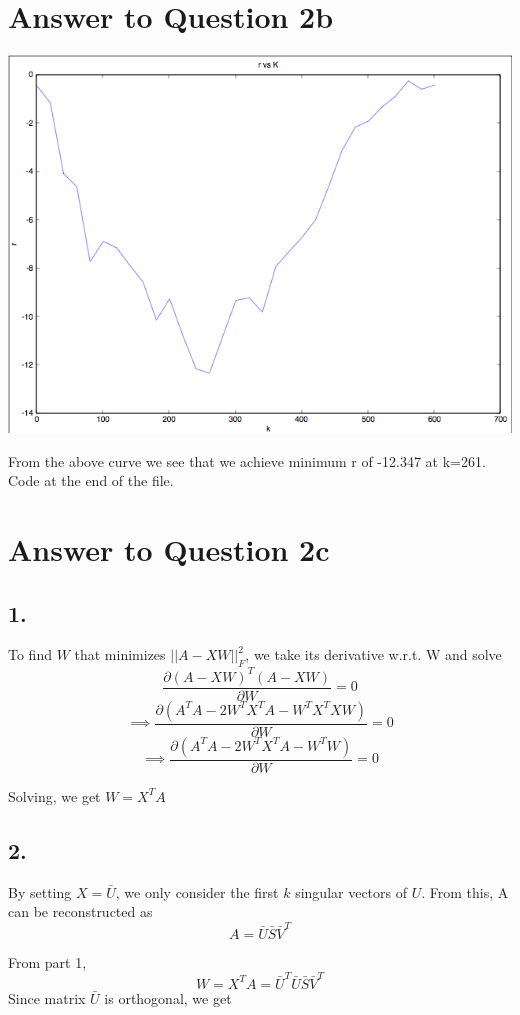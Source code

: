 \documentclass[11pt]{article}
\begin{document}
{\section*{Answer to Question 2b}
\includegraphics[scale=0.8]{q2err}

From the above curve we see that we achieve minimum r of -12.347 at k=261.\\

Code at the end of the file.
\pagebreak[4]
\section*{Answer to Question 2c}

\subsection*{1.}
To find $W$ that minimizes $||A-XW||_F^2$, we take its derivative w.r.t. W and solve
$$ \frac{\partial (A-XW)^T(A-XW)}{\partial W} = 0 $$
$$ \implies \frac{\partial (A^TA-2W^TX^TA-W^TX^TXW)}{\partial W} = 0 $$
$$ \implies \frac{\partial (A^TA-2W^TX^TA-W^TW)}{\partial W} = 0 $$

Solving, we get $W = X^T A$

\subsection*{2.}
By setting $X = \bar{U}$, we only consider the first $k$ singular vectors of $U$. From this, A can be reconstructed as 
$$A = \bar{U}\bar{S}\bar{V}^T$$

From part 1,
$$W = X^T A = \bar{U}^T \bar{U}\bar{S}\bar{V}^T$$
Since matrix $\bar{U}$ is orthogonal, we get

}
\end{document}
